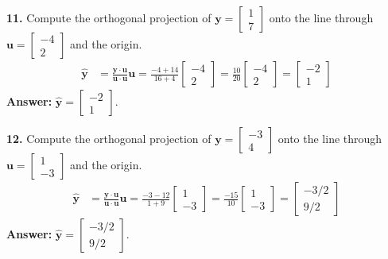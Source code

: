 \documentclass[11pt, letterpaper]{article}
\theoremstyle{definition}
\theoremstyle{remark}
\begin{document}
\textbf{11.} Compute the orthogonal projection of $\mathbf{y} = \begin{bmatrix} 1 \\ 7 \end{bmatrix}$ onto the line through $\mathbf{u} = \begin{bmatrix} -4 \\ 2 \end{bmatrix}$ and the origin.
\begin{align*}
    \hat{\mathbf{y}} &= \frac{\mathbf{y} \cdot \mathbf{u}}{\mathbf{u} \cdot \mathbf{u}} \mathbf{u} = \frac{-4 + 14}{16 + 4} \begin{bmatrix} -4 \\ 2 \end{bmatrix} = \frac{10}{20} \begin{bmatrix} -4 \\ 2 \end{bmatrix} = \begin{bmatrix} -2 \\ 1 \end{bmatrix}
\end{align*}
\textbf{Answer:} $\hat{\mathbf{y}} = \begin{bmatrix} -2 \\ 1 \end{bmatrix}$.

\textbf{12.} Compute the orthogonal projection of $\mathbf{y} = \begin{bmatrix} -3 \\ 4 \end{bmatrix}$ onto the line through $\mathbf{u} = \begin{bmatrix} 1 \\ -3 \end{bmatrix}$ and the origin.
\begin{align*}
    \hat{\mathbf{y}} &= \frac{\mathbf{y} \cdot \mathbf{u}}{\mathbf{u} \cdot \mathbf{u}} \mathbf{u} = \frac{-3 - 12}{1 + 9} \begin{bmatrix} 1 \\ -3 \end{bmatrix} = \frac{-15}{10} \begin{bmatrix} 1 \\ -3 \end{bmatrix} = \begin{bmatrix} -3/2 \\ 9/2 \end{bmatrix}
\end{align*}
\textbf{Answer:} $\hat{\mathbf{y}} = \begin{bmatrix} -3/2 \\ 9/2 \end{bmatrix}$.
\end{document}
